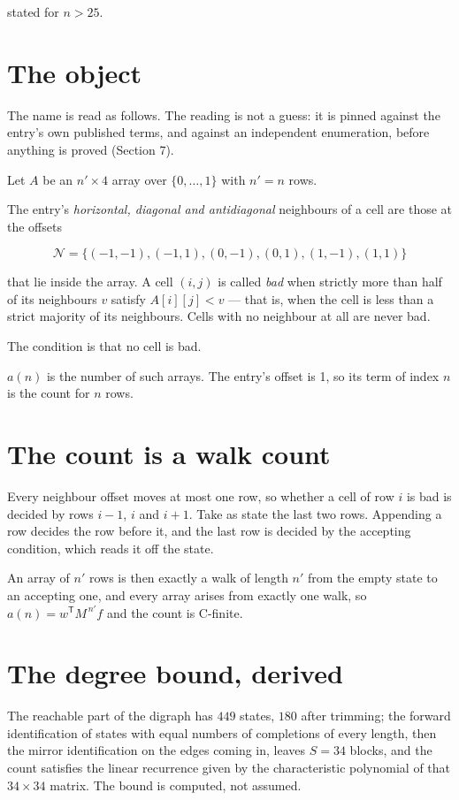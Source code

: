 \documentclass[11pt]{article}
\theoremstyle{definition}
\begin{document}
stated for $n > 25$.

\section{The object}

The name is read as follows. The reading is not a guess: it is pinned against the entry's own published terms, and against an independent enumeration, before anything is proved (Section 7).

Let $A$ be an $n' \times 4$ array over $\{0,\dots,1\}$ with $n' = n$ rows.

The entry's {\itshape horizontal, diagonal and antidiagonal} neighbours of a cell are those at the offsets

\[\mathcal{N} = \{(-1,-1), (-1,1), (0,-1), (0,1), (1,-1), (1,1)\}\]

that lie inside the array. A cell $(i,j)$ is called {\itshape bad} when strictly more than half of its neighbours $v$ satisfy $A[i][j] < v$ --- that is, when the cell is less than a strict majority of its neighbours. Cells with no neighbour at all are never bad.

The condition is that no cell is bad.

$a(n)$ is the number of such arrays. The entry's offset is 1, so its term of index $n$ is the count for $n$ rows.

\section{The count is a walk count}

Every neighbour offset moves at most one row, so whether a cell of row $i$ is bad is decided by rows $i-1$, $i$ and $i+1$. Take as state the last two rows. Appending a row decides the row before it, and the last row is decided by the accepting condition, which reads it off the state.

An array of $n'$ rows is then exactly a walk of length $n'$ from the empty state to an accepting one, and every array arises from exactly one walk, so $a(n) = w^{\mathsf T}M^{\,n'}f$ and the count is C-finite.

\section{The degree bound, derived}

The reachable part of the digraph has $449$ states, $180$ after trimming; the forward identification of states with equal numbers of completions of every length, then the mirror identification on the edges coming in, leaves $S = 34$ blocks, and the count satisfies the linear recurrence given by the characteristic polynomial of that $34\times34$ matrix. The bound is computed, not assumed.
\end{document}

